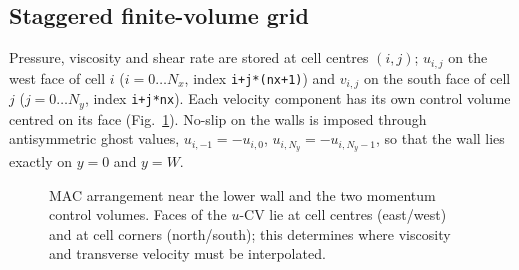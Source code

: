 \subsection{Staggered finite-volume grid}
Pressure, viscosity and shear rate are stored at cell centres $(i,j)$; $u_{i,j}$ on the west face of cell $i$ ($i=0\ldots N_x$, index \texttt{i+j*(nx+1)}) and $v_{i,j}$ on the south face of cell $j$ ($j=0\ldots N_y$, index \texttt{i+j*nx}). Each velocity component has its own control volume centred on its face (Fig.~\ref{fig:grid}). No-slip on the walls is imposed through antisymmetric ghost values, $u_{i,-1}=-u_{i,0}$, $u_{i,N_y}=-u_{i,N_y-1}$, so that the wall lies exactly on $y=0$ and $y=W$.
\begin{figure}[H]\centering
{}
\caption{MAC arrangement near the lower wall and the two momentum control volumes. Faces of the $u$-CV lie at cell centres (east/west) and at cell corners (north/south); this determines where viscosity and transverse velocity must be interpolated.}\label{fig:grid}\end{figure}

